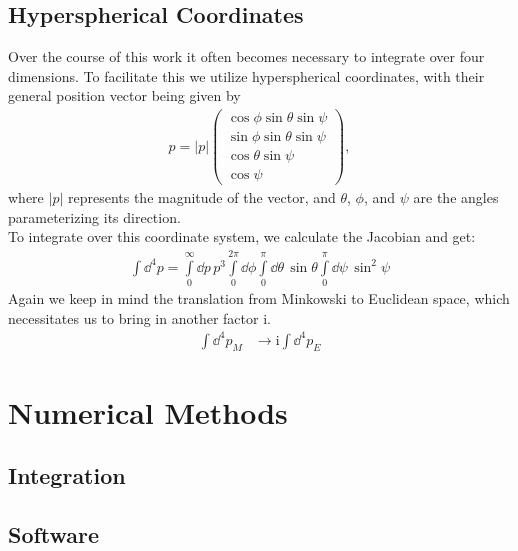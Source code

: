 \documentclass[oneside, openany]{book}
\numberwithin{equation}{chapter}
\numberwithin{figure}{chapter}
\newcommand{\ii}{\mathrm{i}}
\begin{document}
\section{Hyperspherical Coordinates} 
Over the course of this work it often becomes necessary to integrate over four dimensions. To facilitate this we utilize hyperspherical coordinates, with their general position vector being given by
\begin{align}
	p = |p| \begin{pmatrix} \cos\phi\sin\theta\sin\psi \\ \sin\phi\sin\theta\sin\psi \\ \cos\theta\sin\psi \\ \cos\psi \end{pmatrix}, \label{sec:hyper}
\end{align}
where $|p|$ represents the magnitude of the vector, and $\theta$, $\phi$, and $\psi$ are the angles parameterizing its direction. \\
To integrate over this coordinate system, we calculate the Jacobian and get:
\begin{align}
	\int \dd ^4p = \int\limits_0^\infty \dd p \, p^3 \int\limits_0^{2\pi}\dd \phi \int\limits_0^\pi\dd \theta \, \sin\theta \int\limits_0^\pi \dd \psi \, \sin^2\psi \label{eq:hyper}
\end{align}
Again we keep in mind the translation from Minkowski to Euclidean space, which necessitates us to bring in another factor $\ii$. 
\begin{align}
	\int \dd ^4p_M &\rightarrow \ii \int \dd ^4p_E
\end{align}

\chapter{Numerical Methods}
\section{Integration}
\section{Software}
\end{document}
